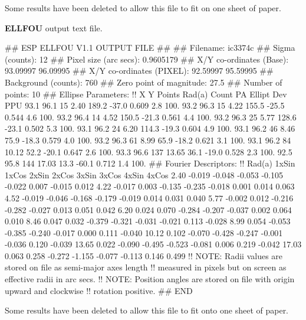 \documentclass[twoside,11pt]{starlink}
\begin{document}
Some results have been deleted to allow this file to fit on
one sheet of paper.

\newpage
\textbf{ELLFOU} output text file.

\begin{terminalv}
## ESP ELLFOU V1.1 OUTPUT FILE
##
## Filename:
ic3374c
## Sigma (counts):
12
## Pixel size (arc secs):
0.9605179
## X/Y co-ordinates (Base):
93.09997 96.09995
## X/Y co-ordinates (PIXEL):
92.59997 95.59995
## Background (counts):
760
## Zero point of magnitude:
27.5
## Number of points:
10
## Ellipse Parameters:
!! X       Y     Points  Rad(a)     Count     PA     Ellipt     Dev   PPU
  93.1    96.1     15     2.40       189.2   -37.0   0.609       2.8  100.
  93.2    96.3     15     4.22       155.5   -25.5   0.544       4.6  100.
  93.2    96.4     14     4.52       150.5   -21.3   0.561       4.4  100.
  93.2    96.3     25     5.77       128.6   -23.1   0.502       5.3  100.
  93.1    96.2     24     6.20       114.3   -19.3   0.604       4.9  100.
  93.1    96.2     46     8.46        75.9   -18.3   0.579       4.0  100.
  93.2    96.3     61     8.99        65.9   -18.2   0.621       3.1  100.
  93.1    96.2     84    10.12        52.2   -20.1   0.647       2.6  100.
  93.3    96.6    137    13.65        36.1   -19.0   0.528       2.3  100.
  92.5    95.8    144    17.03        13.3   -60.1   0.712       1.4  100.
## Fourier Descriptors:
!! Rad(a)   1xSin   1xCos   2xSin   2xCos   3xSin   3xCos   4xSin   4xCos
     2.40  -0.019  -0.048  -0.053  -0.105  -0.022   0.007  -0.015   0.012
     4.22  -0.017   0.003  -0.135  -0.235  -0.018   0.001   0.014   0.063
     4.52  -0.019  -0.046  -0.168  -0.179  -0.019   0.014   0.031   0.040
     5.77  -0.002   0.012  -0.216  -0.282  -0.027   0.013   0.051   0.042
     6.20   0.024   0.070  -0.284  -0.207  -0.037   0.002   0.064   0.010
     8.46   0.047   0.032  -0.379  -0.321  -0.031  -0.021   0.113  -0.028
     8.99   0.054  -0.053  -0.385  -0.240  -0.017   0.000   0.111  -0.040
    10.12   0.102  -0.070  -0.428  -0.247  -0.001  -0.036   0.120  -0.039
    13.65   0.022  -0.090  -0.495  -0.523  -0.081   0.006   0.219  -0.042
    17.03   0.063   0.258  -0.272  -1.155  -0.077  -0.113   0.146   0.499
!! NOTE: Radii values are stored on file as semi-major axes length
!!       measured in pixels but on screen as effective radii in arc secs.
!! NOTE: Position angles are stored on file with origin upward and clockwise
!!       rotation positive.
## END
\end{terminalv}

Some results have been deleted to allow this file to fit onto
one sheet of paper.
\end{document}
